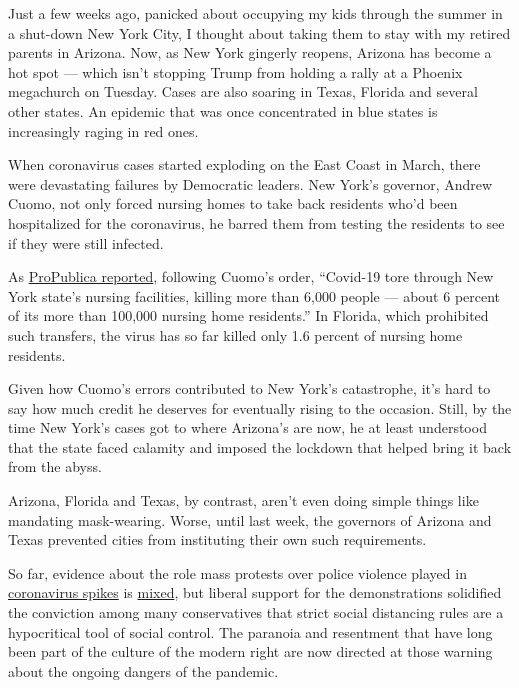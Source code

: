 Just a few weeks ago, panicked about occupying my kids through the
summer in a shut-down New York City, I thought about taking them to stay
with my retired parents in Arizona. Now, as New York gingerly reopens,
Arizona has become a hot spot --- which isn't stopping Trump from
holding a rally at a Phoenix megachurch on Tuesday. Cases are also
soaring in Texas, Florida and several other states. An epidemic that was
once concentrated in blue states is increasingly raging in red ones.

When coronavirus cases started exploding on the East Coast in March,
there were devastating failures by Democratic leaders. New York's
governor, Andrew Cuomo, not only forced nursing homes to take back
residents who'd been hospitalized for the coronavirus, he barred them
from testing the residents to see if they were still infected.

As
\href{https://www.propublica.org/article/fire-through-dry-grass-andrew-cuomo-saw-covid-19-threat-to-nursing-homes-then-he-risked-adding-to-it}{ProPublica
reported}, following Cuomo's order, ``Covid-19 tore through New York
state's nursing facilities, killing more than 6,000 people --- about 6
percent of its more than 100,000 nursing home residents.'' In Florida,
which prohibited such transfers, the virus has so far killed only 1.6
percent of nursing home residents.

Given how Cuomo's errors contributed to New York's catastrophe, it's
hard to say how much credit he deserves for eventually rising to the
occasion. Still, by the time New York's cases got to where Arizona's are
now, he at least understood that the state faced calamity and imposed
the lockdown that helped bring it back from the abyss.

Arizona, Florida and Texas, by contrast, aren't even doing simple things
like mandating mask-wearing. Worse, until last week, the governors of
Arizona and Texas prevented cities from instituting their own such
requirements.

So far, evidence about the role mass protests over police violence
played in
\href{https://www.latimes.com/california/story/2020-06-22/for-third-day-in-a-week-l-a-county-reports-more-than-2-000-new-coronavirus-cases}{coronavirus
spikes} is
\href{https://slate.com/news-and-politics/2020/06/protests-covid-outdoor-masks.html}{mixed},
but liberal support for the demonstrations solidified the conviction
among many conservatives that strict social distancing rules are a
hypocritical tool of social control. The paranoia and resentment that
have long been part of the culture of the modern right are now directed
at those warning about the ongoing dangers of the pandemic.

